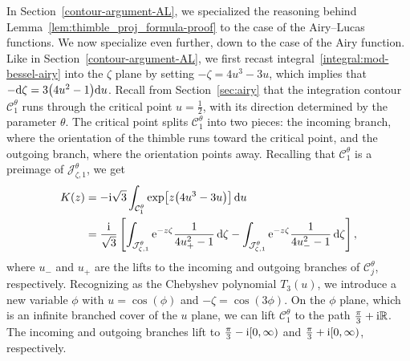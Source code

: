 \documentclass[pdftex]{sigma}
\newcommand{\R}{\mathbb{R}}
\numberwithin{equation}{section}
\begin{document}
In Section~\ref{contour-argument-AL}, we specialized the reasoning behind Lemma~\ref{lem:thimble_proj_formula-proof} to the case of the Airy--Lucas functions. We now specialize even further, down to the case of the Airy function. Like in Section~\ref{contour-argument-AL}, we first recast integral~\eqref{integral:mod-bessel-airy} into the $\zeta$ plane by setting $-\zeta = 4u^3 - 3u$, which implies that $-{\rm d}\zeta = 3\bigl(4u^2 - 1\bigr){\rm d}u$. Recall from Section~\ref{sec:airy} that the integration contour $\mathcal{C}^\theta_1$ runs through the critical point $u = \frac{1}{2}$, with its direction determined by the parameter $\theta$. The critical point splits $\mathcal{C}^\theta_1$ into two pieces: the incoming branch, where the orientation of the thimble runs toward the critical point, and the outgoing branch, where the orientation points away. Recalling that $\mathcal{C}^\theta_1$ is a preimage of $\mathcal{J}^\theta_{\zeta,1}$, we get
\begin{align*}
K(z) & = -{\rm i}\sqrt{3} \int_{\mathcal{C}^\theta_1} \exp\bigl[z \bigl(4u^3 - 3u\bigr)\bigr] \, {\rm d}u \\
& = \frac{{\rm i}}{\sqrt{3}} \left[ \int_{\mathcal{J}^\theta_{\zeta, 1}} {\rm e}^{-z\zeta} \frac{1}{4u_+^2 - 1} \,{\rm d}\zeta - \int_{\mathcal{J}^\theta_{\zeta, 1}} {\rm e}^{-z\zeta} \frac{1}{4u_-^2 - 1} \, {\rm d}\zeta \right],
\end{align*}
where $u_-$ and $u_+$ are the lifts to the incoming and outgoing branches of $\mathcal{C}^\theta_j$, respectively. Recognizing  as the Chebyshev polynomial $T_3(u)$, we introduce a new variable $\phi$ with $u = \cos(\phi)$ and $-\zeta = \cos(3\phi)$. On the $\phi$ plane, which is an infinite branched cover of the $u$ plane, we can lift $\mathcal{C}^\theta_1$ to the path $\frac{\pi}{3} + {\rm i}\R$. The incoming and outgoing branches lift to $\frac{\pi}{3} - {\rm i}[0, \infty)$ and $\frac{\pi}{3} + {\rm i}[0, \infty)$, respectively.
\end{document}
